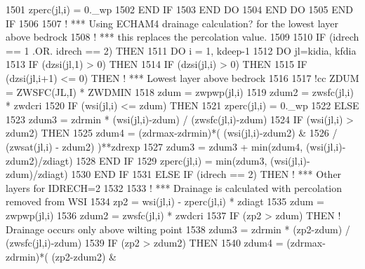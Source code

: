 \begin{DoxyCode}
1501           zperc(jl,i) = 0.\_wp
1502 \textcolor{keywordflow}{        END IF}
1503 \textcolor{keywordflow}{      END DO}
1504 \textcolor{keywordflow}{    END DO}
1505 \textcolor{keywordflow}{  END IF}
1506 
1507 \textcolor{comment}{! *** Using ECHAM4 drainage calculation? for the lowest layer above bedrock}
1508 \textcolor{comment}{! *** this replaces the percolation value.}
1509 
1510   \textcolor{keywordflow}{IF} (idrech == 1 .OR. idrech == 2) \textcolor{keywordflow}{THEN}
1511     \textcolor{keywordflow}{DO} i = 1, kdeep-1
1512       \textcolor{keywordflow}{DO} jl=kidia, kfdia
1513         \textcolor{keywordflow}{IF} (dzsi(jl,1) > 0) \textcolor{keywordflow}{THEN}
1514           \textcolor{keywordflow}{IF} (dzsi(jl,i) > 0) \textcolor{keywordflow}{THEN}
1515             \textcolor{keywordflow}{IF} (dzsi(jl,i+1) <= 0) \textcolor{keywordflow}{THEN}           \textcolor{comment}{! *** Lowest layer above bedrock}
1516 
1517 \textcolor{comment}{!cc              ZDUM = ZWSFC(JL,I) * ZWDMIN}
1518               zdum = zwpwp(jl,i)
1519               zdum2 = zwsfc(jl,i) * zwdcri
1520               \textcolor{keywordflow}{IF} (wsi(jl,i) <= zdum) \textcolor{keywordflow}{THEN}
1521                 zperc(jl,i) = 0.\_wp
1522               \textcolor{keywordflow}{ELSE}
1523                 zdum3 = zdrmin * (wsi(jl,i)-zdum) / (zwsfc(jl,i)-zdum)
1524                 \textcolor{keywordflow}{IF} (wsi(jl,i) > zdum2) \textcolor{keywordflow}{THEN}
1525                   zdum4 = (zdrmax-zdrmin)*( (wsi(jl,i)-zdum2)  &
1526                       / (zwsat(jl,i) - zdum2) )**zdrexp
1527                   zdum3 = zdum3 + min(zdum4, (wsi(jl,i)-zdum2)/zdiagt)
1528 \textcolor{keywordflow}{                END IF}
1529                 zperc(jl,i) = min(zdum3, (wsi(jl,i)-zdum)/zdiagt)
1530 \textcolor{keywordflow}{              END IF}
1531             \textcolor{keywordflow}{ELSE} \textcolor{keywordflow}{IF} (idrech == 2) \textcolor{keywordflow}{THEN}            \textcolor{comment}{! *** Other layers for IDRECH=2}
1532 
1533 \textcolor{comment}{!             *** Drainage is calculated with percolation removed from WSI}
1534               zp2 = wsi(jl,i) - zperc(jl,i) * zdiagt
1535               zdum = zwpwp(jl,i)
1536               zdum2 = zwsfc(jl,i) * zwdcri
1537               \textcolor{keywordflow}{IF} (zp2 > zdum) \textcolor{keywordflow}{THEN}         \textcolor{comment}{! Drainage occurs only above wilting point}
1538                 zdum3 = zdrmin * (zp2-zdum) / (zwsfc(jl,i)-zdum)
1539                 \textcolor{keywordflow}{IF} (zp2 > zdum2) \textcolor{keywordflow}{THEN}
1540                   zdum4 = (zdrmax-zdrmin)*( (zp2-zdum2)  &

\end{DoxyCode}

